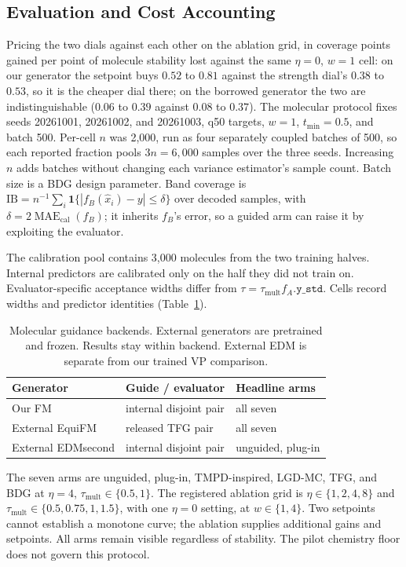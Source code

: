 \documentclass{article}
\newcommand{\IB}{\mathrm{IB}}
\begin{document}
\subsection{Evaluation and Cost Accounting}\label{app:evaluation}
Pricing the two dials against each other on the ablation grid, in coverage points gained per point of molecule stability lost against the same $\eta{=}0$, $w{=}1$ cell: on our generator the setpoint buys $0.52$ to $0.81$ against the strength dial's $0.38$ to $0.53$, so it is the cheaper dial there; on the borrowed generator the two are indistinguishable ($0.06$ to $0.39$ against $0.08$ to $0.37$). The molecular protocol fixes seeds 20261001, 20261002, and 20261003, q50 targets, $w=1$, $t_{\min}=0.5$, and batch 500. Per-cell $n$ was 2{,}000, run as four separately coupled batches of 500, so each reported fraction pools $3n=6{,}000$ samples over the three seeds. Increasing $n$ adds batches without changing each variance estimator's sample count. Batch size is a BDG design parameter. Band coverage is $\IB=n^{-1}\sum_i\mathbf1\{|f_B(\hat x_i)-y|\le\delta\}$ over decoded samples, with $\delta=2\operatorname{MAE}_{\mathrm{cal}}(f_B)$; it inherits $f_B$'s error, so a guided arm can raise it by exploiting the evaluator.

The calibration pool contains 3{,}000 molecules from the two training halves. Internal predictors are calibrated only on the half they did not train on. Evaluator-specific acceptance widths differ from $\tau=\tau_{\mathrm{mult}}f_A.\texttt{y\_std}$. Cells record widths and predictor identities (Table~\ref{tab:backends}).

\begin{table}[!htbp]
\centering\small
\caption{Molecular guidance backends. External generators are pretrained and frozen. Results stay within backend. External EDM is separate from our trained VP comparison.}
\label{tab:backends}
\begin{tabular}{lll}
\toprule
Generator & Guide / evaluator & Headline arms\\
\midrule
Our FM & internal disjoint pair & all seven\\
External EquiFM & released TFG pair & all seven\\
External EDMsecond & internal disjoint pair & unguided, plug-in\\
\bottomrule
\end{tabular}
\end{table}

The seven arms are unguided, plug-in, TMPD-inspired, LGD-MC, TFG, and BDG at $\eta=4$, $\tau_{\mathrm{mult}}\in\{0.5,1\}$. The registered ablation grid is $\eta\in\{1,2,4,8\}$ and $\tau_{\mathrm{mult}}\in\{0.5,0.75,1,1.5\}$, with one $\eta=0$ setting, at $w\in\{1,4\}$. Two setpoints cannot establish a monotone curve; the ablation supplies additional gains and setpoints. All arms remain visible regardless of stability. The pilot chemistry floor does not govern this protocol.
\end{document}
